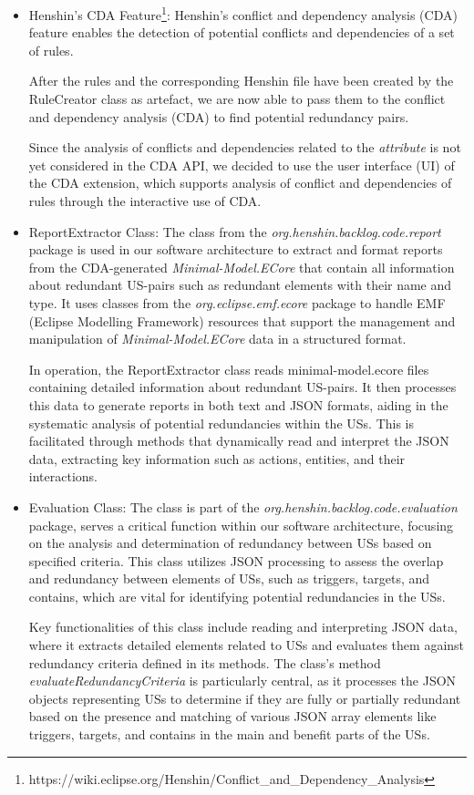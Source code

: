 \begin{itemize}
	\item Henshin's CDA Feature\footnote{https://wiki.eclipse.org/Henshin/Conflict\_and\_Dependency\_Analysis}: Henshin's conflict and dependency analysis (CDA) feature enables the detection of potential conflicts and dependencies of a set of rules.
	
	After the rules and the corresponding Henshin file have been created by the RuleCreator class as artefact, we are now able to pass them to the conflict and dependency analysis (CDA) to find potential redundancy pairs.
	
	Since the analysis of conflicts and dependencies related to the \textit{attribute} is not yet considered in the CDA API, we decided to use the user interface (UI) of the CDA extension, which supports analysis of conflict and dependencies of rules through the interactive use of CDA.
	
	\item ReportExtractor Class: The class from the \textit{org.henshin.backlog.code.report} package is used in our software architecture to extract and format reports from the CDA-generated \textit{Minimal-Model.ECore} that contain all information about redundant US-pairs such as redundant elements with their name and type. It uses classes from the \textit{org.eclipse.emf.ecore} package to handle EMF (Eclipse Modelling Framework) resources that support the management and manipulation of \textit{Minimal-Model.ECore} data in a structured format.
	
	In operation, the ReportExtractor class reads minimal-model.ecore files containing detailed information about redundant US-pairs. It then processes this data to generate reports in both text and JSON formats, aiding in the systematic analysis of potential redundancies within the USs. This is facilitated through methods that dynamically read and interpret the JSON data, extracting key information such as actions, entities, and their interactions.
	
	\item Evaluation Class: The class is part of the \textit{org.henshin.backlog.code.evaluation} package, serves a critical function within our software architecture, focusing on the analysis and determination of redundancy between USs based on specified criteria. This class utilizes JSON processing to assess the overlap and redundancy between elements of USs, such as triggers, targets, and contains, which are vital for identifying potential redundancies in the USs.
	
	Key functionalities of this class include reading and interpreting JSON data, where it extracts detailed elements related to USs and evaluates them against redundancy criteria defined in its methods. The class's method \textit{evaluateRedundancyCriteria} is particularly central, as it processes the JSON objects representing USs to determine if they are fully or partially redundant based on the presence and matching of various JSON array elements like triggers, targets, and contains in the main and benefit parts of the USs.
	
	\end{itemize}
